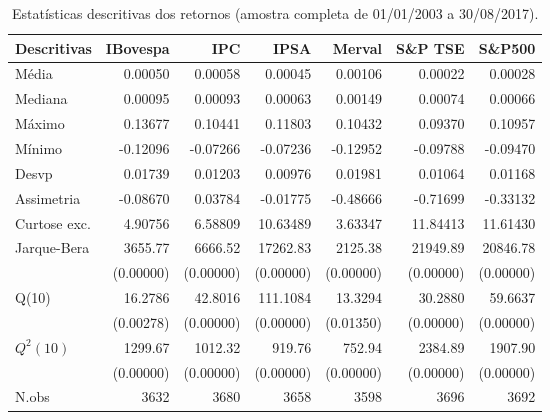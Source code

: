 \begin{table}[H]
\centering
\caption{Estatísticas descritivas dos retornos (amostra completa de 01/01/2003 a 30/08/2017).} 
\label{tab:descritivas}
\begin{tabular}{lrrrrrr}
  \hline
Descritivas & IBovespa & IPC & IPSA & Merval & S\&P TSE & S\&P500 \\ 
  \hline
Média & 0.00050 & 0.00058 & 0.00045 & 0.00106 & 0.00022 & 0.00028 \\ 
  Mediana & 0.00095 & 0.00093 & 0.00063 & 0.00149 & 0.00074 & 0.00066 \\ 
  Máximo & 0.13677 & 0.10441 & 0.11803 & 0.10432 & 0.09370 & 0.10957 \\ 
  Mínimo & -0.12096 & -0.07266 & -0.07236 & -0.12952 & -0.09788 & -0.09470 \\ 
  Desvp & 0.01739 & 0.01203 & 0.00976 & 0.01981 & 0.01064 & 0.01168 \\ 
  Assimetria & -0.08670 & 0.03784 & -0.01775 & -0.48666 & -0.71699 & -0.33132 \\ 
  Curtose exc. & 4.90756 & 6.58809 & 10.63489 & 3.63347 & 11.84413 & 11.61430 \\ 
  Jarque-Bera & 3655.77 & 6666.52 & 17262.83 & 2125.38 & 21949.89 & 20846.78 \\ 
   & (0.00000) & (0.00000) & (0.00000) & (0.00000) & (0.00000) & (0.00000) \\ 
  Q(10) & 16.2786 & 42.8016 & 111.1084 & 13.3294 & 30.2880 & 59.6637 \\ 
   & (0.00278) & (0.00000) & (0.00000) & (0.01350) & (0.00000) & (0.00000) \\ 
  $Q^2(10)$ & 1299.67 & 1012.32 & 919.76 & 752.94 & 2384.89 & 1907.90 \\ 
   & (0.00000) & (0.00000) & (0.00000) & (0.00000) & (0.00000) & (0.00000) \\ 
  N.obs & 3632 & 3680 & 3658 & 3598 & 3696 & 3692 \\ 
   \hline
\end{tabular}
\end{table}
